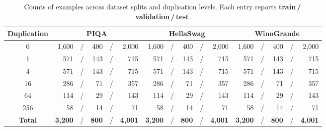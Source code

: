 \begin{table}[h]
    \centering
    \caption{
        Counts of examples across dataset splits and duplication levels. Each entry reports \textbf{train\,/\,validation\,/\,test}.
    }
    \label{tab:hubble-data-splits}

    \small
    \setlength{\tabcolsep}{2.5pt}
    \renewcommand{\arraystretch}{1.18}

    \begingroup
    \begin{tabular}{@{}c
        r c r c r
        @{\quad}
        r c r c r
        @{\quad}
        r c r c r@{}}
        \toprule
        \textbf{Duplication}
        & \multicolumn{5}{c}{\textbf{PIQA}}
        & \multicolumn{5}{c}{\textbf{HellaSwag}}
        & \multicolumn{5}{c}{\textbf{WinoGrande}}
        \\
        \midrule
        0
        & 1,600 & / & 400 & / & 2,000
        & 1,600 & / & 400 & / & 2,000
        & 1,600 & / & 400 & / & 2,000
        \\

        1
        & 571 & / & 143 & / & 715
        & 571 & / & 143 & / & 715
        & 571 & / & 143 & / & 715
        \\

        4
        & 571 & / & 143 & / & 715
        & 571 & / & 143 & / & 715
        & 571 & / & 143 & / & 715
        \\

        16
        & 286 & / & 71 & / & 357
        & 286 & / & 71 & / & 357
        & 286 & / & 71 & / & 357
        \\

        64
        & 114 & / & 29 & / & 143
        & 114 & / & 29 & / & 143
        & 114 & / & 29 & / & 143
        \\

        256
        & 58 & / & 14 & / & 71
        & 58 & / & 14 & / & 71
        & 58 & / & 14 & / & 71
        \\

        \midrule
        \textbf{Total}
        & \textbf{3,200} & / & \textbf{800} & / & \textbf{4,001}
        & \textbf{3,200} & / & \textbf{800} & / & \textbf{4,001}
        & \textbf{3,200} & / & \textbf{800} & / & \textbf{4,001}
        \\
        \bottomrule
    \end{tabular}
    \endgroup
\end{table}
